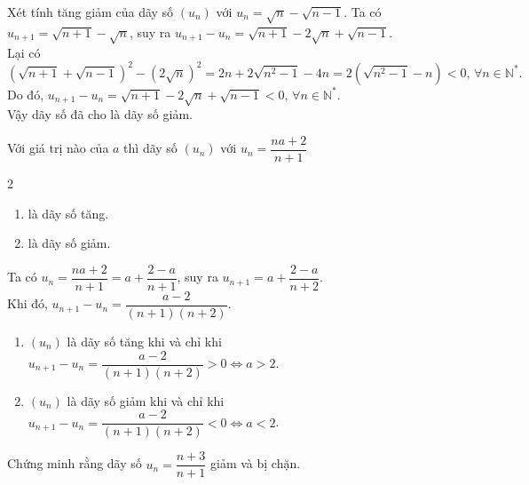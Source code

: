 \begin{bt}%
	Xét tính tăng giảm của dãy số $(u_n)$ với $u_n=\sqrt{n}-\sqrt{n-1}$.
	\loigiai 
	{
		Ta có $u_{n+1}=\sqrt{n+1}-\sqrt{n}$, suy ra $u_{n+1}-u_n=\sqrt{n+1}-2\sqrt{n}+\sqrt{n-1}$.\\
		Lại có $$\left(\sqrt{n+1}+\sqrt{n-1}\right)^2-\left(2\sqrt{n}\right)^2=2n+2\sqrt{n^2-1}-4n=2\left(\sqrt{n^2-1}-n\right)<0,\,\forall n\in\mathbb{N}^*.$$
		Do đó, $u_{n+1}-u_n=\sqrt{n+1}-2\sqrt{n}+\sqrt{n-1}<0,\,\forall n\in\mathbb{N}^*$.\\
		Vậy dãy số đã cho là dãy số giảm.
	}
\end{bt}

\begin{bt}%
	Với giá trị nào của $a$ thì dãy số $(u_n)$ với $u_n=\dfrac{na+2}{n+1}$
	\begin{multicols}{2}
		\begin{enumerate}
			\item là dãy số tăng.
			\item là dãy số giảm.
		\end{enumerate}
	\end{multicols}
	\loigiai 
	{
		Ta có $u_n=\dfrac{na+2}{n+1}=a+\dfrac{2-a}{n+1}$, suy ra $u_{n+1}=a+\dfrac{2-a}{n+2}$.\\
		Khi đó, $u_{n+1}-u_n=\dfrac{a-2}{(n+1)(n+2)}$.
	\begin{enumerate}
		\item $(u_n)$ là dãy số tăng khi và chỉ khi $u_{n+1}-u_n=\dfrac{a-2}{(n+1)(n+2)}>0\Leftrightarrow a>2$.
		\item $(u_n)$ là dãy số giảm khi và chỉ khi $u_{n+1}-u_n=\dfrac{a-2}{(n+1)(n+2)}<0\Leftrightarrow a<2$.
	\end{enumerate}
	}
\end{bt}

\begin{bt}%
	Chứng minh rằng dãy số $u_n=\dfrac{n+3}{n+1}$ giảm và bị chặn.
\end{bt}

